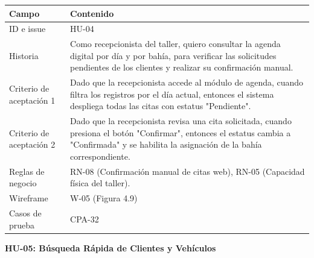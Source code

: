 {\def\LTcaptype{none} %
\begin{longtable}[]{@{}
  >{\raggedright\arraybackslash}p{}
  >{\raggedright\arraybackslash}p{}@{}}
\toprule\noalign{}
\begin{minipage}[b]{\linewidth}\raggedright
\textbf{Campo}
\end{minipage} & \begin{minipage}[b]{\linewidth}\raggedright
\textbf{Contenido}
\end{minipage} \\
\midrule\noalign{}
\endhead
\bottomrule\noalign{}
\endlastfoot
ID e issue & HU-04 \\
Historia & Como recepcionista del taller, quiero consultar la agenda
digital por día y por bahía, para verificar las solicitudes pendientes
de los clientes y realizar su confirmación manual. \\
Criterio de aceptación 1 & Dado que la recepcionista accede al módulo de
agenda, cuando filtra los registros por el día actual, entonces el
sistema despliega todas las citas con estatus "Pendiente". \\
Criterio de aceptación 2 & Dado que la recepcionista revisa una cita
solicitada, cuando presiona el botón "Confirmar", entonces el estatus
cambia a "Confirmada" y se habilita la asignación de la bahía
correspondiente. \\
Reglas de negocio & RN-08 (Confirmación manual de citas web), RN-05
(Capacidad física del taller). \\
Wireframe & W-05 (Figura 4.9) \\
Casos de prueba & CPA-32 \\
\end{longtable}
}

\textbf{HU-05: Búsqueda Rápida de Clientes y Vehículos}

